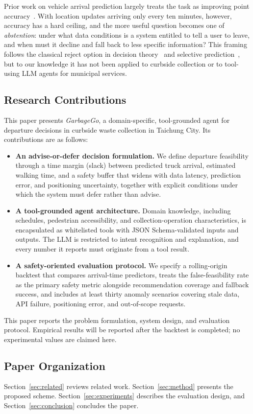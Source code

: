Prior work on vehicle arrival prediction largely treats the task as improving point accuracy~\cite{chien2002,jeong2004}. With location updates arriving only every ten minutes, however, accuracy has a hard ceiling, and the more useful question becomes one of \emph{abstention}: under what data conditions is a system entitled to tell a user to leave, and when must it decline and fall back to less specific information? This framing follows the classical reject option in decision theory~\cite{chow1970} and selective prediction~\cite{geifman2017}, but to our knowledge it has not been applied to curbside collection or to tool-using LLM agents for municipal services.

\subsection{Research Contributions}
This paper presents \emph{GarbageGo}, a domain-specific, tool-grounded agent for departure decisions in curbside waste collection in Taichung City. Its contributions are as follows:
\begin{itemize}
\item \textbf{An advise-or-defer decision formulation.} We define departure feasibility through a time margin (slack) between predicted truck arrival, estimated walking time, and a safety buffer that widens with data latency, prediction error, and positioning uncertainty, together with explicit conditions under which the system must defer rather than advise.
\item \textbf{A tool-grounded agent architecture.} Domain knowledge, including schedules, pedestrian accessibility, and collection-operation characteristics, is encapsulated as whitelisted tools with JSON Schema-validated inputs and outputs. The LLM is restricted to intent recognition and explanation, and every number it reports must originate from a tool result.
\item \textbf{A safety-oriented evaluation protocol.} We specify a rolling-origin backtest that compares arrival-time predictors, treats the false-feasibility rate as the primary safety metric alongside recommendation coverage and fallback success, and includes at least thirty anomaly scenarios covering stale data, API failure, positioning error, and out-of-scope requests.
\end{itemize}
This paper reports the problem formulation, system design, and evaluation protocol. Empirical results will be reported after the backtest is completed; no experimental values are claimed here.

\subsection{Paper Organization}
Section~\ref{sec:related} reviews related work. Section~\ref{sec:method} presents the proposed scheme. Section~\ref{sec:experiments} describes the evaluation design, and Section~\ref{sec:conclusion} concludes the paper.
